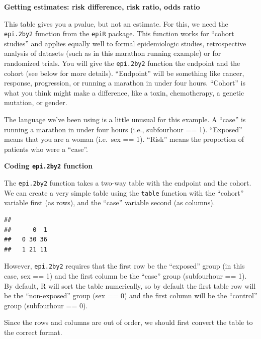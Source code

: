 \documentclass[]{book}
\newenvironment{Shaded}{\begin{snugshade}}{\end{snugshade}}
\newcommand{\KeywordTok}[1]{\textcolor[rgb]{0.13,0.29,0.53}{\textbf{#1}}}
\newcommand{\NormalTok}[1]{#1}
\newcommand{\OperatorTok}[1]{\textcolor[rgb]{0.81,0.36,0.00}{\textbf{#1}}}
\begin{document}
\textbf{Getting estimates: risk difference, risk ratio, odds ratio}

This table gives you a pvalue, but not an estimate. For this, we need the \texttt{epi.2by2} function from the \texttt{epiR} package. This function works for ``cohort studies'' and applies equally well to formal epidemiologic studies, retrospective analysis of datasets (such as in this marathon running example) or for randomized trials. You will give the \texttt{epi.2by2} function the endpoint and the cohort (see below for more details). ``Endpoint'' will be something like cancer, response, progression, or running a marathon in under four hours. ``Cohort'' is what you think might make a difference, like a toxin, chemotherapy, a genetic mutation, or gender.

The language we've been using is a little unusual for this example. A ``case'' is running a marathon in under four hours (i.e., subfourhour == 1). ``Exposed'' means that you are a woman (i.e.~sex == 1). ``Risk'' means the proportion of patients who were a ``case''.

\textbf{Coding \texttt{epi.2by2} function}

The \texttt{epi.2by2} function takes a two-way table with the endpoint and the cohort. We can create a very simple table using the \texttt{table} function with the ``cohort'' variable first (as rows), and the ``case'' variable second (as columns).

\begin{Shaded}
\end{Shaded}

\begin{verbatim}
##    
##      0  1
##   0 30 36
##   1 21 11
\end{verbatim}

However, \texttt{epi.2by2} requires that the first row be the ``exposed'' group (in this case, sex == 1) and the first column be the ``case'' group (subfourhour == 1). By default, R will sort the table numerically, so by default the first table row will be the ``non-exposed'' group (sex == 0) and the first column will be the ``control'' group (subfourhour == 0).

Since the rows and columns are out of order, we should first convert the table to the correct format.
\end{document}
